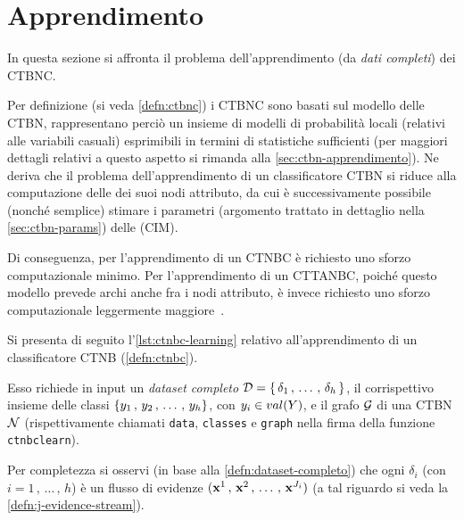 \section{Apprendimento}\label{sec:learning-ctbnc}
In questa sezione si affronta il problema dell'apprendimento (da \emph{dati completi}) dei \acs{CTBNC}.

Per definizione (si veda \ref{defn:ctbnc}) i \acs{CTBNC} sono basati sul modello delle \acs{CTBN}, rappresentano perciò un insieme di modelli di probabilità locali (relativi alle variabili casuali) esprimibili in termini di statistiche sufficienti (per maggiori dettagli relativi a questo aspetto si rimanda alla \autoref{sec:ctbn-apprendimento}). Ne deriva che il problema dell'apprendimento di un classificatore \acs{CTBN} si riduce alla computazione delle  dei suoi nodi attributo, da cui è successivamente possibile (nonché semplice) stimare i parametri (argomento trattato in dettaglio nella \autoref{sec:ctbn-params}) delle \cim{} (\acs{CIM}).

Di conseguenza, per l'apprendimento di un \acs{CTNBC} è richiesto uno sforzo computazionale minimo. Per l'apprendimento di un \acs{CTTANBC}, poiché questo modello prevede archi anche fra i nodi attributo, è invece richiesto uno sforzo computazionale leggermente maggiore~\citep{Stella2012}.

Si presenta di seguito l'\autoref{lst:ctnbc-learning} relativo all'apprendimento di un classificatore \acs{CTNB} (\autoref{defn:ctnbc}).

Esso richiede in input un \emph{dataset completo} $\mathcal{D}=\{\,\delta_1\,,\,\dotsc\,,\,\delta_h\,\}$, il corrispettivo insieme delle classi $\{\mathnormal{y}_1\,,\,\mathnormal{y}_2\,,\,\dotsc\,,\,\mathnormal{y}_h\}$, con $\mathnormal{y}_i \in val(\mathnormal{Y})$, e il grafo $\mathcal{G}$ di una \acs{CTBN} $\mathcal{N}$ (rispettivamente chiamati \lstinline[]|data|, \lstinline[]|classes| e \lstinline[]|graph| nella firma della funzione \lstinline[]|ctnbclearn|).

Per completezza si osservi (in base alla \autoref{defn:dataset-completo}) che ogni $\delta_i$ (con $i=1\,,\,\dotsc\,,\,h$) è un flusso di evidenze $(\mathbf{x}^1\,,\,\mathbf{x}^2\,,\,\dotsc\,,\,\mathbf{x}^{J_i})$ (a tal riguardo si veda la \autoref{defn:j-evidence-stream}).

